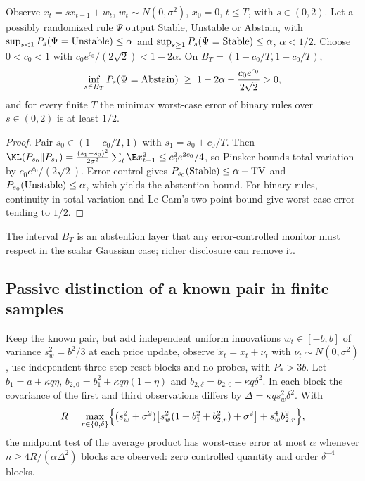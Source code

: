 \begin{theorem}\label{thm:abstain}
Observe $x_t=sx_{t-1}+w_t$, $w_t\sim N(0,\sigma^2)$, $x_0=0$, $t\le T$, with $s\in(0,2)$. Let a possibly randomized rule $\Psi$ output Stable, Unstable or Abstain, with $\sup_{s<1}P_s(\Psi={\rm Unstable})\le\alpha$ and $\sup_{s\ge1}P_s(\Psi={\rm Stable})\le\alpha$, $\alpha<1/2$. Choose $0<c_0<1$ with $c_0e^{c_0}/(2\sqrt2)<1-2\alpha$. On $B_T=(1-c_0/T,1+c_0/T)$,
\[
\inf_{s\in B_T}P_s(\Psi={\rm Abstain})\;\ge\;1-2\alpha-\frac{c_0e^{c_0}}{2\sqrt2}>0 ,
\]
and for every finite $T$ the minimax worst-case error of binary rules over $s\in(0,2)$ is at least $1/2$.
\end{theorem}

\begin{proof}
Pair $s_0\in(1-c_0/T,1)$ with $s_1=s_0+c_0/T$. Then $\KL(P_{s_0}\|P_{s_1})=\frac{(s_1-s_0)^2}{2\sigma^2}\sum_t\E x_{t-1}^2\le c_0^2e^{2c_0}/4$, so Pinsker bounds total variation by $c_0e^{c_0}/(2\sqrt2)$. Error control gives $P_{s_0}({\rm Stable})\le\alpha+{\rm TV}$ and $P_{s_0}({\rm Unstable})\le\alpha$, which yields the abstention bound. For binary rules, continuity in total variation and Le Cam's two-point bound give worst-case error tending to $1/2$.
\end{proof}

The interval $B_T$ is an abstention layer that any error-controlled monitor must respect in the scalar Gaussian case; richer disclosure can remove it.

\subsection{Passive distinction of a known pair in finite samples}

\begin{proposition}\label{prop:passive0}
Keep the known pair, but add independent uniform innovations $w_t\in[-b,b]$ of variance $s_w^2=b^2/3$ at each price update, observe $\tilde x_t=x_t+\nu_t$ with $\nu_t\sim N(0,\sigma^2)$, use independent three-step reset blocks and no probes, with $P_*>3b$. Let $b_1=a+\kappa q\eta$, $b_{2,0}=b_1^2+\kappa q\eta(1-\eta)$ and $b_{2,\delta}=b_{2,0}-\kappa q\delta^2$. In each block the covariance of the first and third observations differs by $\Delta=\kappa qs_w^2\delta^2$. With
\[
R=\max_{r\in\{0,\delta\}}\Bigl\{(s_w^2+\sigma^2)\bigl[s_w^2(1+b_1^2+b_{2,r}^2)+\sigma^2\bigr]+s_w^4b_{2,r}^2\Bigr\},
\]
the midpoint test of the average product has worst-case error at most $\alpha$ whenever $n\ge4R/(\alpha\Delta^2)$ blocks are observed: zero controlled quantity and order $\delta^{-4}$ blocks.
\end{proposition}

